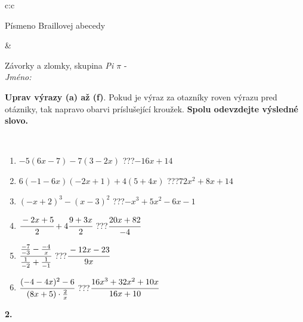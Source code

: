 \documentclass[10pt]{report}
\begin{document}
\begin{tabular}{c:c}
\begin{minipage}[c][104.5mm][t]{0.5\linewidth}
\begin{center}
\begin{minipage}{0.20\linewidth}
\begin{center}
{\small Písmeno Braillovej abecedy}
\end{center}
\end{minipage}
\end{center}
\end{minipage}
&
\begin{minipage}[c][104.5mm][t]{0.5\linewidth}
\begin{center}
\vspace{7mm}
{\huge Závorky a zlomky, skupina \textit{Pi $\pi$} -}\\[5mm]
\textit{Jméno:}\phantom{xxxxxxxxxxxxxxxxxxxxxxxxxxxxxxxxxxxxxxxxxxxxxxxxxxxxxxxxxxxxxxxxx}\\[5mm]
\begin{minipage}{0.95\linewidth}
\begin{center}
\textbf{Uprav výrazy (a) až (f)}. Pokud je výraz za otazníky roven výrazu pred otázniky, tak napravo obarvi príslušející kroužek. \textbf{Spolu odevzdejte výsledné slovo.}
\end{center}
\end{minipage}
\\[1mm]
\begin{minipage}{0.79\linewidth}
\begin{center}
\begin{varwidth}{\linewidth}
\begin{enumerate}
\normalsize
\item $-5(6x-7)-7(3-2x)$\quad \dotfill\; ???\;\dotfill \quad $-16x+14$
\item $6(-1-6x)(-2x+1)+4(5+4x)$\quad \dotfill\; ???\;\dotfill \quad $72x^2+8x+14$
\item $(-x+2)^3-(x-3)^2$\quad \dotfill\; ???\;\dotfill \quad $-x^3+5x^2-6x-1$
\item $\cfrac{-2x+5}{2}+4\cfrac{9+3x}{2}$\quad \dotfill\; ???\;\dotfill \quad $\cfrac{20x+82}{-4}$
\item $\cfrac{\frac{-7}{-3}-\frac{-4}{x}}{\frac{1}{-2}+\frac{1}{-1}}$\quad \dotfill\; ???\;\dotfill \quad $\cfrac{-12x-23}{9x}$
\item $\cfrac{(-4-4x)^2-6}{(8x+5)\cdot\frac{2}{x}}$\quad \dotfill\; ???\;\dotfill \quad $\cfrac{16x^3+32x^2+10x}{16x+10}$
\end{enumerate}
\end{varwidth}
\end{center}
\end{minipage}
\begin{minipage}{0.20\linewidth}
\begin{center}
{\Huge\bfseries 2.} \\[2mm]

\end{center}
\end{minipage}
\end{center}
\end{minipage}
\end{tabular}
\end{document}
